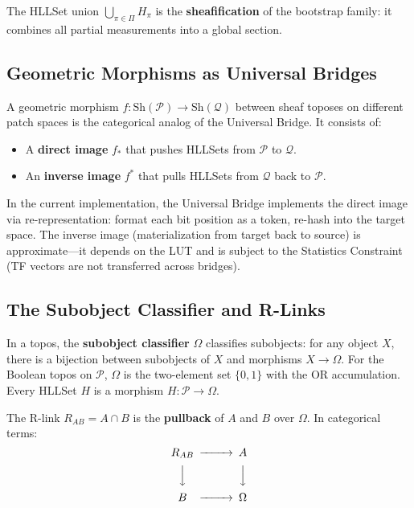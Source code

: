\documentclass[11pt,a4paper]{article}
\theoremstyle{remark}
\begin{document}
The HLLSet union $\bigcup_{\pi \in \Pi} H_\pi$ is the \textbf{sheafification} of the
bootstrap family: it combines all partial measurements into a global section.

\subsection{Geometric Morphisms as Universal Bridges}

A geometric morphism $f: \text{Sh}(\mathcal{P}) \to \text{Sh}(\mathcal{Q})$ between
sheaf toposes on different patch spaces is the categorical analog of the Universal
Bridge. It consists of:
\begin{itemize}[leftmargin=*,nosep]
  \item A \textbf{direct image} $f_*$ that pushes HLLSets from $\mathcal{P}$ to
    $\mathcal{Q}$.
  \item An \textbf{inverse image} $f^*$ that pulls HLLSets from $\mathcal{Q}$ back to
    $\mathcal{P}$.
\end{itemize}

In the current implementation, the Universal Bridge implements the direct image via
re-representation: format each bit position as a token, re-hash into the target space.
The inverse image (materialization from target back to source) is approximate---it
depends on the LUT and is subject to the Statistics Constraint (TF vectors are not
transferred across bridges).

\subsection{The Subobject Classifier and R-Links}

In a topos, the \textbf{subobject classifier} $\Omega$ classifies subobjects: for any
object $X$, there is a bijection between subobjects of $X$ and morphisms $X \to \Omega$.
For the Boolean topos on $\mathcal{P}$, $\Omega$ is the two-element set $\{0, 1\}$
with the OR accumulation. Every HLLSet $H$ is a morphism $H: \mathcal{P} \to \Omega$.

The R-link $R_{AB} = A \cap B$ is the \textbf{pullback} of $A$ and $B$ over $\Omega$.
In categorical terms:
\begin{equation}
  \begin{CD}
    R_{AB} @>>> A \\
    @VVV @VVV \\
    B @>>> \Omega
  \end{CD}
\end{equation}
\end{document}

